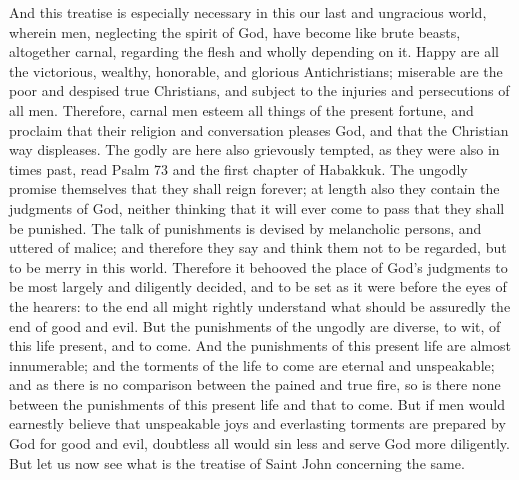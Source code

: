 And this treatise is especially necessary in this our last and ungracious world, wherein men, neglecting the spirit of God, have become like brute beasts, altogether carnal, regarding the flesh and wholly depending on it. Happy are all the victorious, wealthy, honorable, and glorious Antichristians; miserable are the poor and despised true Christians, and subject to the injuries and persecutions of all men. Therefore, carnal men esteem all things of the present fortune, and proclaim that their religion and conversation pleases God, and that the Christian way displeases. The godly are here also grievously tempted, as they were also in times past, read Psalm 73 and the first chapter of Habakkuk. The ungodly promise themselves that they shall reign forever; at length also they contain the judgments of God, neither thinking that it will ever come to pass that they shall be punished. The talk of punishments is devised by melancholic persons, and uttered of malice; and therefore they say and think them not to be regarded, but to be merry in this world. Therefore it behooved the place of God’s judgments to be most largely and diligently decided, and to be set as it were before the eyes of the hearers: to the end all might rightly understand what should be assuredly the end of good and evil. But the punishments of the ungodly are diverse, to wit, of this life present, and to come. And the punishments of this present life are almost innumerable; and the torments of the life to come are eternal and unspeakable; and as there is no comparison between the pained and true fire, so is there none between the punishments of this present life and that to come. But if men would earnestly believe that unspeakable joys and everlasting torments are prepared by God for good and evil, doubtless all would sin less and serve God more diligently. But let us now see what is the treatise of Saint John concerning the same.

